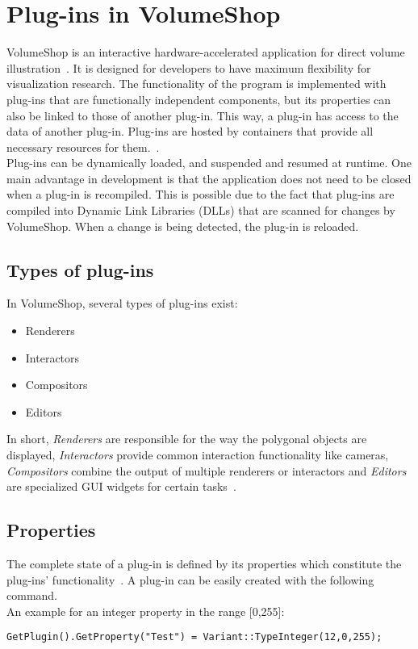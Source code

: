 
\section{Plug-ins in VolumeShop}
VolumeShop is an interactive hardware-accelerated application for direct volume illustration~\cite{proc:volumeshop}. It is designed for developers to have maximum flexibility for visualization research. The functionality of the program is implemented with plug-ins that are functionally independent components, but its properties can also be linked to those of another plug-in. This way, a plug-in has access to the data of another plug-in. Plug-ins are hosted by containers that provide all necessary resources for them.~\cite{misc:volumeshop101}.\\
\newline
Plug-ins can be dynamically loaded, and suspended and resumed at runtime. One main advantage in development is that the application does not need to be closed when a plug-in is recompiled. This is possible due to the fact that plug-ins are compiled into Dynamic Link Libraries (DLLs) that are scanned for changes by VolumeShop. When a change is being detected, the plug-in is reloaded.

\subsection{Types of plug-ins}
In VolumeShop, several types of plug-ins exist:
\begin{itemize}
	\item Renderers
	\item Interactors
	\item Compositors
	\item Editors
\end{itemize}

In short, \emph{Renderers} are responsible for the way the polygonal objects are displayed, \emph{Interactors} provide common interaction functionality like cameras, \emph{Compositors} combine the output of multiple renderers or interactors and \emph{Editors} are specialized GUI widgets for certain tasks~\cite{misc:volumeshop101}.

\subsection{Properties}
The complete state of a plug-in is defined by its properties which constitute the plug-ins' functionality~\cite{misc:volumeshop101}. A plug-in can be easily created with the following command. \\
An example for an integer property in the range [0,255]:
\begin{lstlisting}
GetPlugin().GetProperty("Test") = Variant::TypeInteger(12,0,255);
\end{lstlisting}


